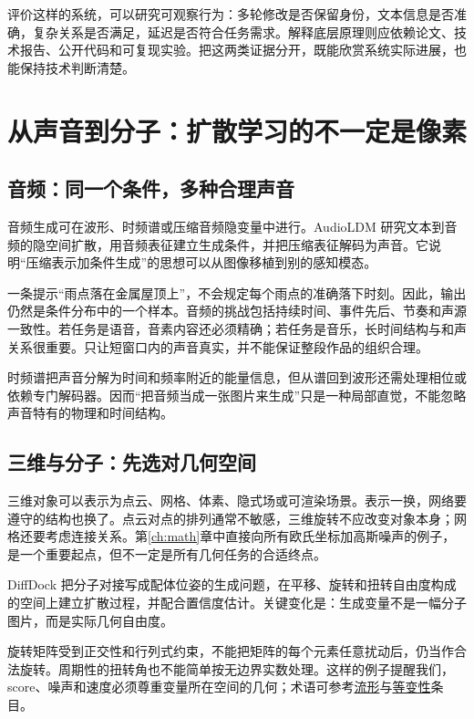 评价这样的系统，可以研究可观察行为：多轮修改是否保留身份，文本信息是否准确，复杂关系是否满足，延迟是否符合任务需求。解释底层原理则应依赖论文、技术报告、公开代码和可复现实验。把这两类证据分开，既能欣赏系统实际进展，也能保持技术判断清楚。

\section{从声音到分子：扩散学习的不一定是像素}
\label{sec:application-beyond}

\subsection{音频：同一个条件，多种合理声音}

音频生成可在波形、时频谱或压缩音频隐变量中进行。AudioLDM 研究文本到音频的隐空间扩散，用音频表征建立生成条件，并把压缩表征解码为声音。它说明“压缩表示加条件生成”的思想可以从图像移植到别的感知模态。\cite{a_audioldm}

一条提示“雨点落在金属屋顶上”，不会规定每个雨点的准确落下时刻。因此，输出仍然是条件分布中的一个样本。音频的挑战包括持续时间、事件先后、节奏和声源一致性。若任务是语音，音素内容还必须精确；若任务是音乐，长时间结构与和声关系很重要。只让短窗口内的声音真实，并不能保证整段作品的组织合理。

时频谱把声音分解为时间和频率附近的能量信息，但从谱回到波形还需处理相位或依赖专门解码器。因而“把音频当成一张图片来生成”只是一种局部直觉，不能忽略声音特有的物理和时间结构。

\subsection{三维与分子：先选对几何空间}

三维对象可以表示为点云、网格、体素、隐式场或可渲染场景。表示一换，网络要遵守的结构也换了。点云对点的排列通常不敏感，三维旋转不应改变对象本身；网格还要考虑连接关系。第\ref{ch:math}章中直接向所有欧氏坐标加高斯噪声的例子，是一个重要起点，但不一定是所有几何任务的合适终点。

DiffDock 把分子对接写成配体位姿的生成问题，在平移、旋转和扭转自由度构成的空间上建立扩散过程，并配合置信度估计。关键变化是：生成变量不是一幅分子图片，而是实际几何自由度。\cite{a_diffdock}

旋转矩阵受到正交性和行列式约束，不能把矩阵的每个元素任意扰动后，仍当作合法旋转。周期性的扭转角也不能简单按无边界实数处理。这样的例子提醒我们，score、噪声和速度必须尊重变量所在空间的几何；术语可参考\hyperref[gl:manifold]{流形}与\hyperref[gl:equivariance]{等变性}条目。

